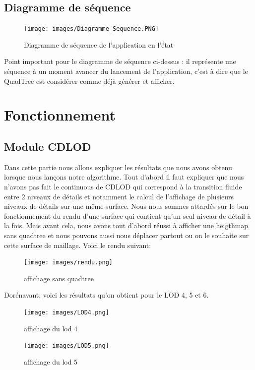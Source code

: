\documentclass[12pt]{report}
\begin{document}
\section{Diagramme de séquence}
\begin{figure}[h]
    \centering
    \texttt{[image: images/Diagramme\_Sequence.PNG]}
    \caption{Diagramme de séquence de l'application en l'état}
\end{figure}
Point important pour le diagramme de séquence ci-dessus : il représente une séquence à un moment avancer du lancement de l'application, c'est à dire que le QuadTree est considérer comme déjà générer et afficher.

\chapter{Fonctionnement}

\section{Module CDLOD}

Dans cette partie nous allons expliquer les résultats que nous avons obtenu lorsque nous lançons notre algorithme. Tout d'abord il faut expliquer que nous n'avons pas fait le continuous de CDLOD qui correspond à la transition fluide entre 2 niveaux de détails et notamment le calcul de l'affichage de plusieurs niveaux de détails sur une même surface. Nous nous sommes attardés sur le bon fonctionnement du rendu d'une surface qui contient qu'un seul niveau de détail à la fois. 
Mais avant cela, nous avons tout d'abord réussi à afficher une heigthmap sans quadtree et nous pouvons aussi nous déplacer partout ou on le souhaite sur cette surface de maillage. Voici le rendu suivant:

\begin{figure}[h]
            \centering
            \texttt{[image: images/rendu.png]}
            \caption{affichage sans quadtree}
        \end{figure}


Dorénavant, voici les résultats qu'on obtient pour le LOD 4, 5 et 6.

\begin{figure}[h]
            \centering
            \texttt{[image: images/LOD4.png]}
            \caption{affichage du lod 4}
        \end{figure}
        
\begin{figure}[h]
            \centering
            \texttt{[image: images/LOD5.png]}
            \caption{affichage du lod 5}
        \end{figure}
        
\end{document}
